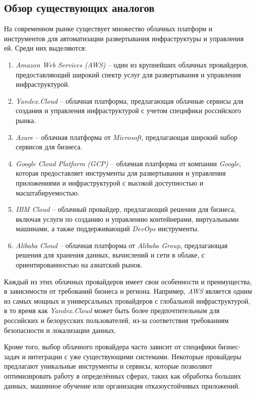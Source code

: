 \subsection{Обзор существующих аналогов}
\label{sec:existing_analogs}
На современном рынке существует множество облачных платформ и инструментов для автоматизации развертывания инфраструктуры и управления ей. Среди них выделяются:
\begin{enumerate}
    \item \textit{Amazon Web Services (AWS)} -- один из крупнейших облачных провайдеров, предоставляющий широкий спектр услуг для развертывания и управления инфраструктурой.
    \item \textit{Yandex.Cloud} -- облачная платформа, предлагающая облачные сервисы для создания и управления инфраструктурой с учетом специфики российского рынка\cite{yandexcloud}.
    \item \textit{Azure} -- облачная платформа от \textit{Microsoft}, предлагающая широкий набор сервисов для бизнеса.
    \item \textit{Google Cloud Platform (GCP)} -- облачная платформа от компании \textit{Google}, которая предоставляет инструменты для развертывания и управления приложениями и инфраструктурой с высокой доступностью и масштабируемостью.
    \item \textit{IBM Cloud} -- облачный провайдер, предлагающий решения для бизнеса, включая услуги по созданию и управлению контейнерами, виртуальными машинами, а также поддерживающий \textit{DevOps} инструменты.
    \item \textit{Alibaba Cloud} -- облачная платформа от \textit{Alibaba Group}, предлагающая решения для хранения данных, вычислений и сети в облаке, с ориентированностью на азиатский рынок.
\end{enumerate}

Каждый из этих облачных провайдеров имеет свои особенности и преимущества, в зависимости от требований бизнеса и региона. Например, \textit{AWS} является одним из самых мощных и универсальных провайдеров с глобальной инфраструктурой, в то время как \textit{Yandex.Cloud} может быть более предпочтительным для российских и белорусских пользователей, из-за соответствия требованиям безопасности и локализации данных.

Кроме того, выбор облачного провайдера часто зависит от специфики бизнес-задач и интеграции с уже существующими системами. Некоторые провайдеры предлагают уникальные инструменты и сервисы, которые позволяют оптимизировать работу в определённых сферах, таких как обработка больших данных, машинное обучение или организация отказоустойчивых приложений.

